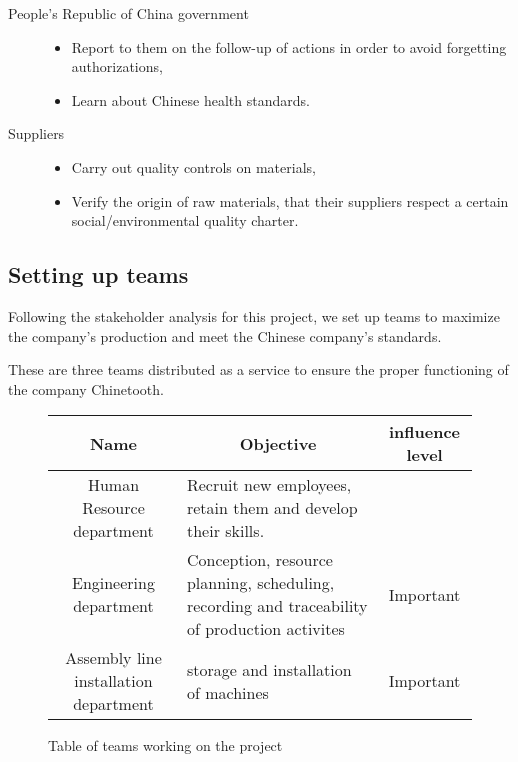 \begin{description}
    \item[People's Republic of China government]
    \begin{itemize}
        \item Report to them on the follow-up of actions in order to avoid forgetting authorizations,
        \item Learn about Chinese health standards.
    \end{itemize} 
\end{description}  

\begin{description}
    \item[Suppliers]
    \begin{itemize}
        \item Carry out quality controls on materials,
        \item Verify the origin of raw materials, that their suppliers respect a certain social/environmental quality charter.
    \end{itemize} 
\end{description}  

\subsection{Setting up teams}

Following the stakeholder analysis for this project, we set up teams to maximize the company's production and meet the Chinese company's standards.

These are three teams distributed as a service to ensure the proper functioning of the company Chinetooth.

\begin{figure}[h]
\centering
\begin{tabular}{| c | p{6cm} | c |}
    \hline
    \rowcolor{heading-color}Name & \multicolumn{1}{c|}{Objective} & influence level \\
    \hline
    Human Resource department & Recruit new employees, retain them and develop their skills. & \\
    \hline
    Engineering department & Conception, resource planning, scheduling, recording and traceability of production activites & Important \\
    \hline 
    Assembly line installation department & storage and installation of machines & Important \\
    \hline 
\end{tabular}
\caption{Table of teams working on the project}
\end{figure}

